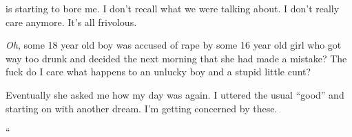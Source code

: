 \noindent
\april{} is starting to bore me.
I don't recall what we were talking about.
I don't really care anymore.  It's all frivolous.


\textit{Oh}, some 18 year old boy was accused of rape by some
16 year old girl who got way too drunk and decided the
next morning that she had made a mistake?
The fuck do I care what happens to an unlucky boy and
a stupid little cunt?


Eventually she asked me how my day was again.
I uttered the usual ``good'' and starting on with another dream.
I'm getting concerned by these.
\vspace*{3ex}


\begin{adjustwidth}{2em}{2em}
\noindent\Huge``\normalsize
\begin{adjustwidth}{1em}{1em}

\end{adjustwidth}
\end{adjustwidth}

